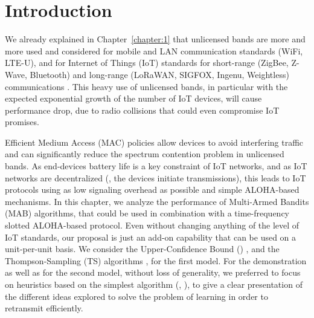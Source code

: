 




\section{Introduction}
\label{sec:4:motivations}

We already explained in Chapter~\ref{chapter:1} that
unlicensed bands are more and more used and considered for mobile and LAN communication standards (WiFi, LTE-U), and for Internet of Things (IoT) standards for short-range (ZigBee, Z-Wave, Bluetooth) and long-range (LoRaWAN, SIGFOX, Ingenu, Weightless) communications \cite{Centenaro16}.
This heavy use of unlicensed bands, in particular with the expected exponential growth of the number of IoT devices, will cause performance drop, due to radio collisions that could even compromise IoT promises.

Efficient Medium Access (MAC) policies allow devices to avoid interfering traffic and can significantly reduce the spectrum contention problem in unlicensed bands.
As end-devices battery life is a key constraint of IoT networks,
and as IoT networks are decentralized (\ie, the devices initiate transmissions),
this leads to IoT protocols using as low signaling overhead as possible and simple ALOHA-based mechanisms.
%
In this chapter, we analyze the performance of Multi-Armed Bandits (MAB) algorithms, that could be used in combination with a time-frequency slotted ALOHA-based protocol.
Even without changing anything of the level of IoT standards, our proposal is just an add-on capability that can be used on a unit-per-unit basis.
We consider the Upper-Confidence Bound (\UCB) \cite{Auer02}, and the Thompson-Sampling (TS) algorithms \cite{Thompson33,AgrawalGoyal11,
Kaufmann12Thompson}, for the first model. For the demonstration as well as for the second model, without loss of generality, we preferred to focus on heuristics based on the simplest algorithm (\ie, \UCB), to give a clear presentation of the different ideas explored to solve the problem of learning in order to retransmit efficiently.

